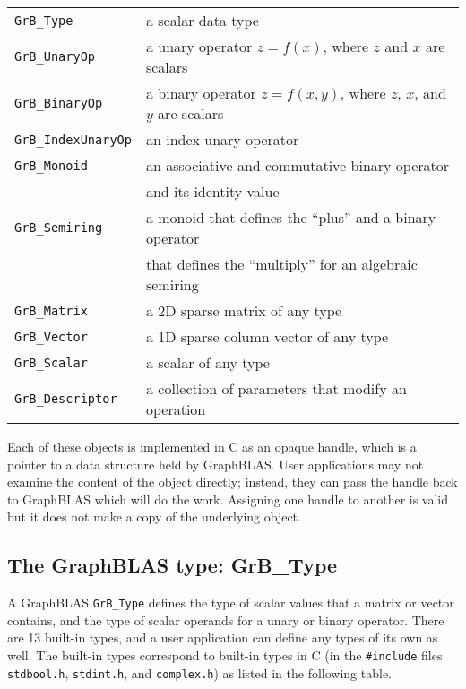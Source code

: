 \documentclass[12pt]{article}
\begin{document}
{\vspace{0.1in}
\noindent
{\small
\begin{tabular}{ll}
\hline
\verb'GrB_Type'      & a scalar data type \\
\verb'GrB_UnaryOp'   & a unary operator $z=f(x)$, where $z$ and $x$ are scalars\\
\verb'GrB_BinaryOp'  & a binary operator $z=f(x,y)$, where $z$, $x$, and $y$ are scalars\\
\verb'GrB_IndexUnaryOp'  & an index-unary operator \\
\verb'GrB_Monoid'    & an associative and commutative binary operator  \\
                     & and its identity value \\
\verb'GrB_Semiring'  & a monoid that defines the ``plus'' and a binary operator\\
                     & that defines the ``multiply'' for an algebraic semiring \\
\verb'GrB_Matrix'    & a 2D sparse matrix of any type \\
\verb'GrB_Vector'    & a 1D sparse column vector of any type \\
\verb'GrB_Scalar'    & a scalar of any type \\
\verb'GrB_Descriptor'& a collection of parameters that modify an operation \\
\hline
\end{tabular}
}
\vspace{0.1in}

Each of these objects is implemented in C as an opaque handle, which is a
pointer to a data structure held by GraphBLAS.  User applications may not
examine the content of the object directly; instead, they can pass the handle
back to GraphBLAS which will do the work.  Assigning one handle to another
is valid but it does not make a copy of the underlying object.

\newpage
\subsection{The GraphBLAS type: {\sf GrB\_Type}} %
\label{type}

A GraphBLAS \verb'GrB_Type' defines the type of scalar values that a matrix or
vector contains, and the type of scalar operands for a unary or binary
operator.  There are 13 built-in types, and a user application can define
any types of its own as well.  The built-in types correspond to built-in types
in C (in the \verb'#include' files \verb'stdbool.h', \verb'stdint.h', and
\verb'complex.h') as listed in the following table.

}
\end{document}
